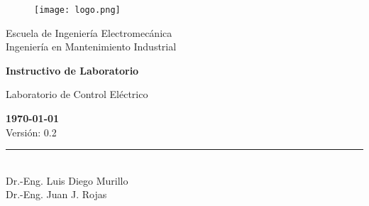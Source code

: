 \documentclass[12pt,letterpaper]{report}
\newcommand{\escuela}{Escuela de Ingeniería Electromecánica}
\newcommand{\programa}{Ingeniería en Mantenimiento Industrial}
\newcommand{\curso}{Laboratorio de Control Eléctrico}
\begin{document}
\begin{titlepage}

\begin{center}
\vspace*{1in}
\begin{figure}[htb]
\begin{center}
\texttt{[image: logo.png]}
\end{center}
\end{figure}
\vspace*{0.4in}
\begin{Large}
\escuela\\
\vspace*{0.15in}
\programa\\
\vspace*{0.8in}
\end{Large}
\vspace*{0.2in}
\begin{Large}
\textbf{Instructivo de Laboratorio} \\
\end{Large}
\vspace*{0.3in}
\begin{large}
\curso\\
\end{large}
\vspace*{2.5in}
\begin{tiny}
\textbf{\today}\\
Versión: 0.2\\
\end{tiny}
\rule{60mm}{0.1mm}\\
\vspace*{0.1 in}
Dr.-Eng. Luis Diego Murillo \\
Dr.-Eng. Juan J. Rojas
\end{center}

\end{titlepage}

\tableofcontents


% 
% 
% 
% 
% 
% 
% 


\appendix







\end{document}
